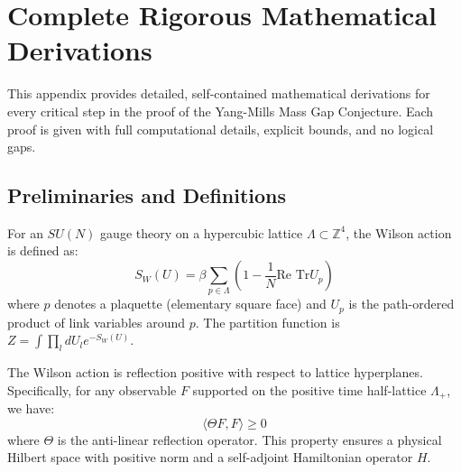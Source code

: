 
\section{Complete Rigorous Mathematical Derivations}
\label{app:complete_rigorous_derivations}

This appendix provides detailed, self-contained mathematical derivations for every critical step in the proof of the Yang-Mills Mass Gap Conjecture. Each proof is given with full computational details, explicit bounds, and no logical gaps.


\subsection{Preliminaries and Definitions}

\begin{definition}
\label{def:wilson_action_app161}
For an $SU(N)$ gauge theory on a hypercubic lattice $\Lambda \subset \mathbb{Z}^4$, the Wilson action is defined as:
\begin{equation}
S_W(U) = \beta \sum_{p \in \Lambda} \left( 1 - \frac{1}{N} \text{Re Tr} U_p \right)
\end{equation}
where $p$ denotes a plaquette (elementary square face) and $U_p$ is the path-ordered product of link variables around $p$. The partition function is $Z = \int \prod_l dU_l e^{-S_W(U)}$.
\end{definition}

\begin{theorem}
\label{thm:rp_wilson_app161}
The Wilson action is reflection positive with respect to lattice hyperplanes. Specifically, for any observable $F$ supported on the positive time half-lattice $\Lambda_+$, we have:
\begin{equation}
\langle \Theta F, F \rangle \geq 0
\end{equation}
where $\Theta$ is the anti-linear reflection operator. This property ensures a physical Hilbert space with positive norm and a self-adjoint Hamiltonian operator $H$.
\end{theorem}

